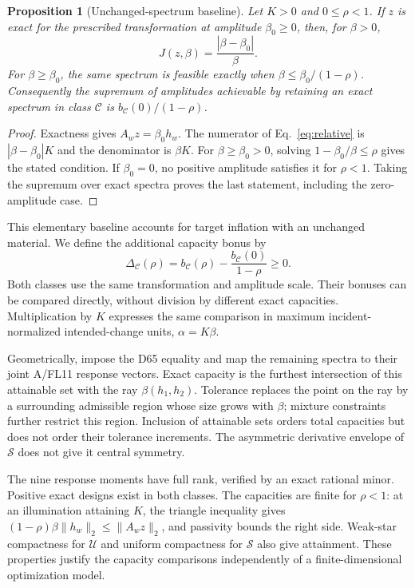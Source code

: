 \documentclass{optica-article}
\newtheorem{proposition}{Proposition}
\begin{document}
\begin{proposition}[Unchanged-spectrum baseline]\label{prop:baseline}
Let $K>0$ and $0\leq\rho<1$. If $z$ is exact for the prescribed transformation at amplitude $\beta_0\geq0$, then, for $\beta>0$,
\begin{equation}
 J(z,\beta)=\frac{|\beta-\beta_0|}{\beta}.
 \label{eq:inflationexact}
\end{equation}
For $\beta\geq\beta_0$, the same spectrum is feasible exactly when $\beta\leq\beta_0/(1-\rho)$. Consequently the supremum of amplitudes achievable by retaining an exact spectrum in class $\mathcal C$ is $b_{\mathcal C}(0)/(1-\rho)$.
\end{proposition}
\begin{proof}
Exactness gives $A_wz=\beta_0h_w$. The numerator of Eq.~\eqref{eq:relative} is $|\beta-\beta_0|K$ and the denominator is $\beta K$. For $\beta\geq\beta_0>0$, solving $1-\beta_0/\beta\leq\rho$ gives the stated condition. If $\beta_0=0$, no positive amplitude satisfies it for $\rho<1$. Taking the supremum over exact spectra proves the last statement, including the zero-amplitude case.
\end{proof}
This elementary baseline accounts for target inflation with an unchanged material. We define the additional capacity bonus by
\begin{equation}
 \Delta_{\mathcal C}(\rho)=b_{\mathcal C}(\rho)-\frac{b_{\mathcal C}(0)}{1-\rho}\geq0.
 \label{eq:bonus}
\end{equation}
Both classes use the same transformation and amplitude scale. Their bonuses can be compared directly, without division by different exact capacities. Multiplication by $K$ expresses the same comparison in maximum incident-normalized intended-change units, $\alpha=K\beta$.

Geometrically, impose the D65 equality and map the remaining spectra to their joint A/FL11 response vectors. Exact capacity is the furthest intersection of this attainable set with the ray $\beta(h_1,h_2)$. Tolerance replaces the point on the ray by a surrounding admissible region whose size grows with $\beta$; mixture constraints further restrict this region. Inclusion of attainable sets orders total capacities but does not order their tolerance increments. The asymmetric derivative envelope of $\mathcal S$ does not give it central symmetry.

The nine response moments have full rank, verified by an exact rational minor. Positive exact designs exist in both classes. The capacities are finite for $\rho<1$: at an illumination attaining $K$, the triangle inequality gives $(1-\rho)\beta\|h_w\|_2\leq\|A_wz\|_2$, and passivity bounds the right side. Weak-star compactness for $\mathcal U$ and uniform compactness for $\mathcal S$ also give attainment. These properties justify the capacity comparisons independently of a finite-dimensional optimization model.
\end{document}
